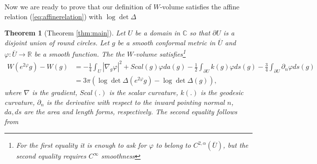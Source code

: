 \documentclass[12pt]{amsart}
\newtheorem{theorem}{Theorem}[section]
\begin{document}
Now we are ready to prove that our definition of $W$-volume satisfies the affine relation (\ref{eq:affinerelation}) with $\log\det\Delta$

\begin{theorem}[Theorem \ref{thm:main}]
Let $U$ be a domain in $\mathbb{C}$ so that $\partial U$ is a disjoint union of round circles. Let $g$ be a smooth conformal metric in $\overline{U}$ and $\varphi:\overline{U}\rightarrow\mathbb{R}$ be a smooth function. The the $W$-volume satisfies\footnote{For the first equality it is enough to ask for $\varphi$ to belong to $C^{2,\alpha}(\overline{U})$, but the second equality requires $C^\infty$ smoothness}
\begin{equation}\label{eq:Polyakov}
\begin{split}
    W(e^{2\varphi}g) - W(g) &= -\frac14\int_U |\nabla_g\varphi|^2 + Scal(g)\varphi da(g) -\frac12\int_{\partial U} k(g)\varphi ds(g) -\frac34 \int_{\partial U} \partial_n\varphi ds(g)
    \\&= 3\pi (\log\det\Delta(e^{2\varphi}g) - \log\det\Delta(g)),
\end{split}
\end{equation}
where $\nabla$ is the gradient, $Scal(.)$ is the scalar curvature, $k(.)$ is the geodesic curvature, $\partial_n$ is the derivative with respect to the inward pointing normal $n$, $da, ds$ are the area and length forms, respectively. The second equality follows from \cite[Equation (1.17)]{OsgoodPhillipsSarnak}
\end{theorem}
\end{document}
